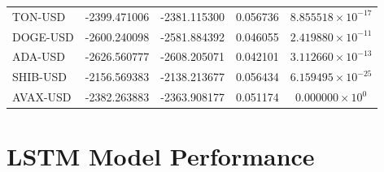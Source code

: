 \documentclass{ledger}
\begin{document}
\begin{table}[h]
\begin{tabular}{|l|c|c|c|c|}
TON-USD & -2399.471006 & -2381.115300 & 0.056736 & $8.855518 \times 10^{-17}$ \\
DOGE-USD & -2600.240098 & -2581.884392 & 0.046055 & $2.419880 \times 10^{-11}$ \\
ADA-USD & -2626.560777 & -2608.205071 & 0.042101 & $3.112660 \times 10^{-13}$ \\
SHIB-USD & -2156.569383 & -2138.213677 & 0.056434 & $6.159495 \times 10^{-25}$ \\
AVAX-USD & -2382.263883 & -2363.908177 & 0.051174 & $0.000000 \times 10^{0}$ \\
\hline
\end{tabular}
\end{table}

\pagebreak
\setcounter{section}{2}
\section{LSTM Model Performance}\label{appendix:lstm_model_performance}
\end{document}
